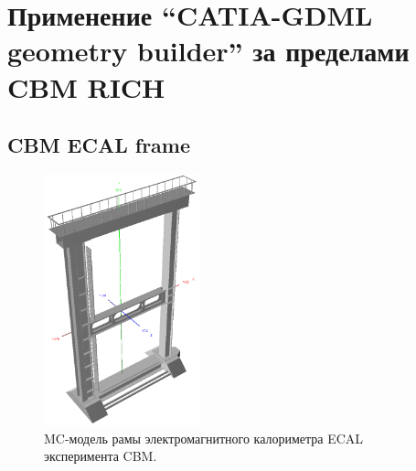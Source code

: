 
\section{Применение ``CATIA-GDML geometry builder'' за пределами CBM RICH}\label{sec:secBuilderOtherUsage}

\subsection{CBM ECAL frame}\label{sec:secCbmEcalFrame}


\begin{figure}[H]
\centering
\includegraphics[width=0.4\textwidth]{pictures/CBM_ECAL_frame.png}
\caption{MC-модель рамы электромагнитного калориметра ECAL эксперимента CBM.}
\label{fig:CbmEcalFrame}
\end{figure}

